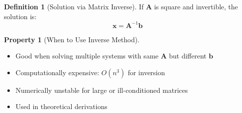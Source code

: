 \documentclass[12pt,a4paper]{article}
\theoremstyle{definition}
\newtheorem{definition}{Definition}[section]
\newtheorem{property}{Property}[section]
\begin{document}
\begin{definition}[Solution via Matrix Inverse]
If $\mathbf{A}$ is square and invertible, the solution is:
\[
\mathbf{x} = \mathbf{A}^{-1}\mathbf{b}
\]
\end{definition}

\begin{property}[When to Use Inverse Method]
\begin{itemize}
\item[\checkmark] Good when solving multiple systems with same $\mathbf{A}$ but different $\mathbf{b}$
\item[$\times$] Computationally expensive: $O(n^3)$ for inversion
\item[$\times$] Numerically unstable for large or ill-conditioned matrices
\item[\checkmark] Used in theoretical derivations
\end{itemize}
\end{property}
\end{document}
